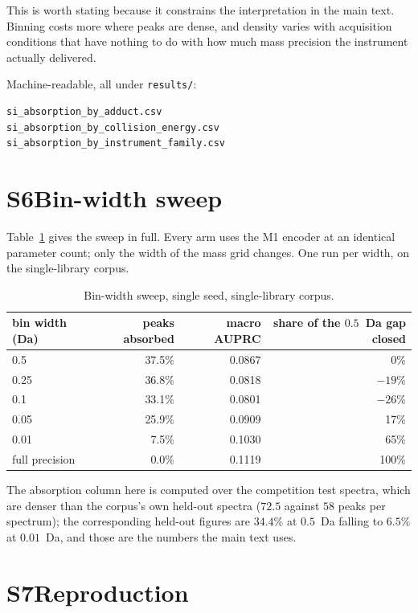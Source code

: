\documentclass[11pt]{article}
\begin{document}
This is worth stating because it constrains the interpretation in the main text.
Binning costs more where peaks are dense, and density varies with acquisition
conditions that have nothing to do with how much mass precision the instrument
actually delivered.

\noindent Machine-readable, all under \texttt{results/}:
\begin{verbatim}
si_absorption_by_adduct.csv
si_absorption_by_collision_energy.csv
si_absorption_by_instrument_family.csv
\end{verbatim}

\section*{S6\quad Bin-width sweep}

Table~\ref{tab:s5} gives the sweep in full. Every arm uses the M1 encoder at an
identical parameter count; only the width of the mass grid changes. One run per
width, on the single-library corpus.

\begin{table}[htbp]
\centering
\caption{Bin-width sweep, single seed, single-library corpus.}
\label{tab:s5}
\small
\begin{tabular}{l r r r}
\toprule
bin width (Da) & peaks absorbed & macro AUPRC & share of the $0.5$~Da gap closed \\
\midrule
0.5            & 37.5\% & 0.0867 & 0\% \\
0.25           & 36.8\% & 0.0818 & $-19$\% \\
0.1            & 33.1\% & 0.0801 & $-26$\% \\
0.05           & 25.9\% & 0.0909 & 17\% \\
0.01           & 7.5\%  & 0.1030 & 65\% \\
full precision & 0.0\%  & 0.1119 & 100\% \\
\bottomrule
\end{tabular}
\end{table}

The absorption column here is computed over the competition test spectra, which are
denser than the corpus's own held-out spectra ($72.5$ against $58$ peaks per
spectrum); the corresponding held-out figures are $34.4\%$ at $0.5$~Da falling to
$6.5\%$ at $0.01$~Da, and those are the numbers the main text uses.

\section*{S7\quad Reproduction}
\end{document}
